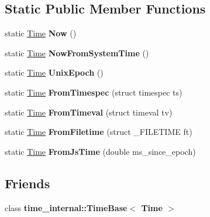\subsection*{Static Public Member Functions}
\begin{DoxyCompactItemize}
\item 
\mbox{\label{classv8_1_1base_1_1Time_a485c6079d0a94b6e93cc931b2857382d}} 
static \mbox{\hyperlink{classv8_1_1base_1_1Time}{Time}} {\bfseries Now} ()
\item 
\mbox{\label{classv8_1_1base_1_1Time_a5c4a31685f5096e8597736c68b0969a7}} 
static \mbox{\hyperlink{classv8_1_1base_1_1Time}{Time}} {\bfseries Now\+From\+System\+Time} ()
\item 
\mbox{\label{classv8_1_1base_1_1Time_a44f04cdf4cf07b26ad5073825d82d8cc}} 
static \mbox{\hyperlink{classv8_1_1base_1_1Time}{Time}} {\bfseries Unix\+Epoch} ()
\item 
\mbox{\label{classv8_1_1base_1_1Time_a1f4311b50b1e6d80974dc3c1d485c6e7}} 
static \mbox{\hyperlink{classv8_1_1base_1_1Time}{Time}} {\bfseries From\+Timespec} (struct timespec ts)
\item 
\mbox{\label{classv8_1_1base_1_1Time_af4de5e39ec25ca6ba75561e9792be776}} 
static \mbox{\hyperlink{classv8_1_1base_1_1Time}{Time}} {\bfseries From\+Timeval} (struct timeval tv)
\item 
\mbox{\label{classv8_1_1base_1_1Time_a78a0ea40386d260073005c1cb67bee8d}} 
static \mbox{\hyperlink{classv8_1_1base_1_1Time}{Time}} {\bfseries From\+Filetime} (struct \+\_\+\+F\+I\+L\+E\+T\+I\+ME ft)
\item 
\mbox{\label{classv8_1_1base_1_1Time_a77f4ff7a1c48f5d1d591946118cdb8ca}} 
static \mbox{\hyperlink{classv8_1_1base_1_1Time}{Time}} {\bfseries From\+Js\+Time} (double ms\+\_\+since\+\_\+epoch)
\end{DoxyCompactItemize}
\subsection*{Friends}
\begin{DoxyCompactItemize}
\item 
\mbox{\label{classv8_1_1base_1_1Time_aa19772ee401e5cf2a775205465b259d4}} 
class {\bfseries time\+\_\+internal\+::\+Time\+Base$<$ Time $>$}
\end{DoxyCompactItemize}

